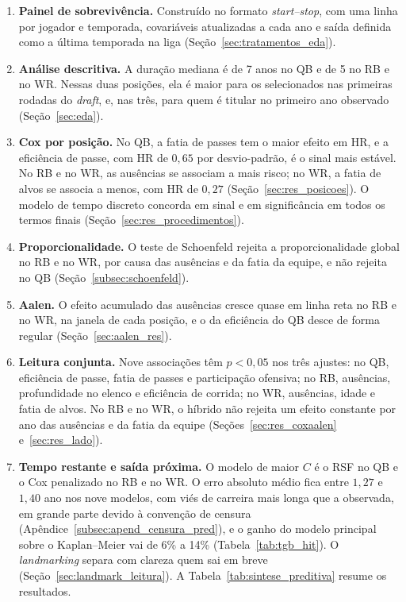 \begin{enumerate}
  \item \textbf{Painel de sobrevivência.} Construído no formato \textit{start--stop}, com uma linha por jogador e temporada, covariáveis atualizadas a cada ano e saída definida como a última temporada na liga (Seção~\ref{sec:tratamentos_eda}).
  \item \textbf{Análise descritiva.} A duração mediana é de 7 anos no QB e de 5 no RB e no WR. Nessas duas posições, ela é maior para os selecionados nas primeiras rodadas do \textit{draft}, e, nas três, para quem é titular no primeiro ano observado (Seção~\ref{sec:eda}).
  \item \textbf{Cox por posição.} No QB, a fatia de passes tem o maior efeito em HR, e a eficiência de passe, com HR de $0{,}65$ por desvio-padrão, é o sinal mais estável. No RB e no WR, as ausências se associam a mais risco; no WR, a fatia de alvos se associa a menos, com HR de $0{,}27$ (Seção~\ref{sec:res_posicoes}). O modelo de tempo discreto concorda em sinal e em significância em todos os termos finais (Seção~\ref{sec:res_procedimentos}).
  \item \textbf{Proporcionalidade.} O teste de Schoenfeld rejeita a proporcionalidade global no RB e no WR, por causa das ausências e da fatia da equipe, e não rejeita no QB (Seção~\ref{subsec:schoenfeld}).
  \item \textbf{Aalen.} O efeito acumulado das ausências cresce quase em linha reta no RB e no WR, na janela de cada posição, e o da eficiência do QB desce de forma regular (Seção~\ref{sec:aalen_res}).
  \item \textbf{Leitura conjunta.} Nove associações têm $p<0{,}05$ nos três ajustes: no QB, eficiência de passe, fatia de passes e participação ofensiva; no RB, ausências, profundidade no elenco e eficiência de corrida; no WR, ausências, idade e fatia de alvos. No RB e no WR, o híbrido não rejeita um efeito constante por ano das ausências e da fatia da equipe (Seções~\ref{sec:res_coxaalen} e~\ref{sec:res_lado}).
  \item \textbf{Tempo restante e saída próxima.} O modelo de maior $C$ é o RSF no QB e o Cox penalizado no RB e no WR. O erro absoluto médio fica entre $1{,}27$ e $1{,}40$ ano nos nove modelos, com viés de carreira mais longa que a observada, em grande parte devido à convenção de censura (Apêndice~\ref{subsec:apend_censura_pred}), e o ganho do modelo principal sobre o Kaplan--Meier vai de 6\% a 14\% (Tabela~\ref{tab:tgb_hit}). O \textit{landmarking} separa com clareza quem sai em breve (Seção~\ref{sec:landmark_leitura}). A Tabela~\ref{tab:sintese_preditiva} resume os resultados.
\end{enumerate}

